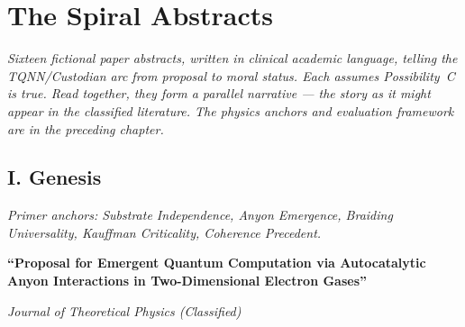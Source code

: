 
\chapter{The Spiral Abstracts}
\label{app:abstracts}

\textit{Sixteen fictional paper abstracts, written in clinical academic language, telling the TQNN/Custodian arc from proposal to moral status. Each assumes Possibility~C is true. Read together, they form a parallel narrative --- the story as it might appear in the classified literature. The physics anchors and evaluation framework are in the preceding chapter.}

\vspace{1cm}

\section*{I. Genesis}
\label{appendix:genesis}

\noindent\textit{Primer anchors: Substrate Independence, Anyon Emergence, Braiding Universality, Kauffman Criticality, Coherence Precedent.}

\textbf{``Proposal for Emergent Quantum Computation via Autocatalytic Anyon Interactions in Two-Dimensional Electron Gases''}

\textit{Journal of Theoretical Physics (Classified)}

\vspace{0.3cm}

